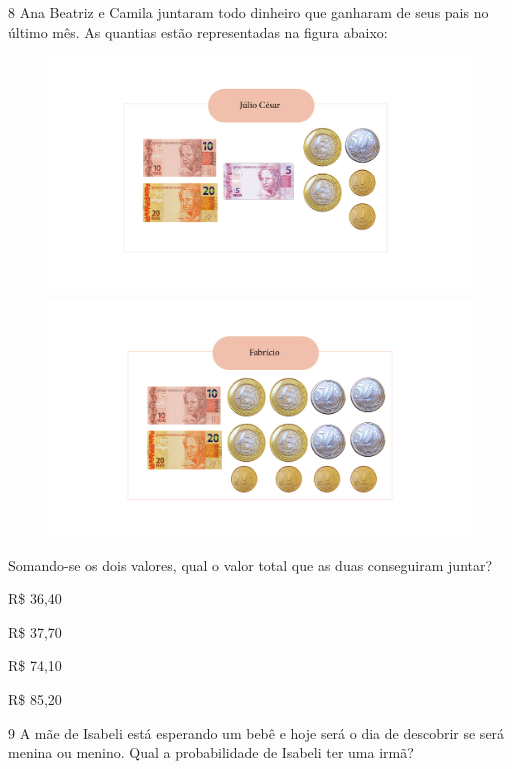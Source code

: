 \num{8} Ana Beatriz e Camila juntaram todo dinheiro que ganharam de seus
pais no último mês. As quantias estão representadas na figura abaixo:

\begin{figure}[htpb!]
\includegraphics[width=.5\textwidth]{../ilustracoes/MAT5/SAEB_5ANO_MAT_figura114a.png}
\includegraphics[width=.5\textwidth]{../ilustracoes/MAT5/SAEB_5ANO_MAT_figura114b.png}
\end{figure}

Somando-se os dois valores, qual o valor total que as duas conseguiram
juntar?

\begin{escolha}
\item
  R\$ 36,40
\item
  R\$ 37,70
\item
  R\$ 74,10
\item
  R\$ 85,20
\end{escolha}


\num{9} A mãe de Isabeli está esperando um bebê e hoje será o dia de
descobrir se será menina ou menino. Qual a probabilidade de Isabeli ter
uma irmã?

